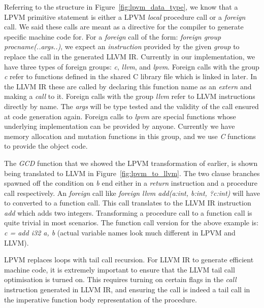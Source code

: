 Referring to the structure in Figure~\ref{fig:lpvm_data_type}, we know that a
LPVM primitive statement is either a LPVM \textit{local} procedure call or a
\textit{foreign} call. We said these calls are meant as a directive for the
compiler to generate specific machine code for. For a \textit{foreign} call of
the form: \textit{foreign group proc\textunderscore name(..args..)}, we expect
an \textit{instruction} provided by the given \textit{group} to replace the
call in the generated LLVM IR. Currently in our implementation, we have three
types of foreign groups: \textit{c}, \textit{llvm}, and \textit{lpvm}. Foreign
calls with the group \textit{c} refer to functions defined in the shared C
library file which is linked in later. In the LLVM IR these are called by
declaring this function name as an \textit{extern} and making a \textit{call}
to it. Foreign calls with the group \textit{llvm} refer to LLVM instructions
directly by name. The \textit{args} will be type tested and the validity of the
call ensured at code generation again. Foreign calls to \textit{lpvm} are
special functions whose underlying implementation can be provided by
anyone. Currently we have memory allocation and mutation functions in this
group, and we use \textit{C} functions to provide the object code.

The \textit{GCD} function that we showed the LPVM transformation of earlier, is
shown being translated to LLVM in Figure~\ref{fig:lpvm_to_llvm}. The two clause
branches spawned off the condition on \textit{b} end either in a
\textit{return} instruction and a procedure call respectively. An
\textit{foreign} call like \textit{foreign llvm add(a:int, b:int, ?c:int)} will
have to converted to a function call. This call translates to the LLVM IR
instruction \textit{add} which adds two integers. Transforming a procedure call
to a function call is quite trivial in most scenarios. The function call
version for the above example is: \textit{c = add i32 a, b} (actual variable
names look much different in LPVM and LLVM).

LPVM replaces loops with tail call recursion. For LLVM IR to generate efficient
machine code, it is extremely important to ensure that the LLVM tail call
optimisation is turned on. This requires turning on certain flags in the
\textit{call} instruction generated in LLVM IR, and ensuring the call is indeed
a tail call in the imperative function body representation of the procedure.



